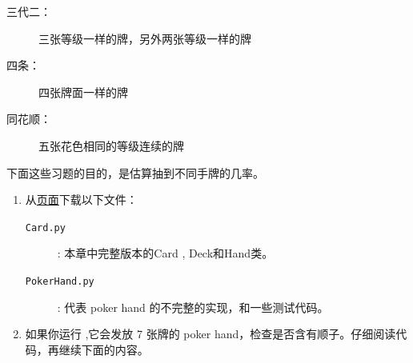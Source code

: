\begin{exercise}
\begin{description}
\item [三代二：] 三张等级一样的牌，另外两张等级一样的牌

\item [四条：] 四张牌面一样的牌

\item [同花顺：] 五张花色相同的等级连续的牌

\end{description}


下面这些习题的目的，是估算抽到不同手牌的几率。

\begin{enumerate}


\item 从\href{http://thinkpython2.com/code}{页面}下载以下文件：

\begin{description}


\item[{\tt Card.py}]: 本章中完整版本的Card , Deck和Hand类。


\item[{\tt PokerHand.py}]: 代表 poker hand 的不完整的实现，和一些测试代码。

\end{description}


\item 如果你运行  ,它会发放 7 张牌的 poker hand，检查是否含有顺子。仔细阅读代码，再继续下面的内容。



\end{enumerate}
\end{exercise}
